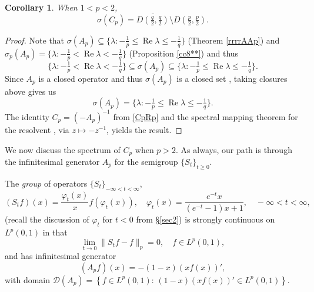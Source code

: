 \documentclass[11pt]{amsart}
\numberwithin{equation}{section}
\theoremstyle{plain}
\newtheorem{Corollary}[equation]{Corollary}
\theoremstyle{definition}
\renewcommand{\leq}{\leqslant}
\renewcommand{\geq}{\geqslant}
\renewcommand{\subset}{\subseteq}
\renewcommand{\phi}{\varphi}
\renewcommand{\Re}[1]{\operatorname{Re} #1 }
\newcommand{\0}{{\color{lightgray}0}}
\begin{document}


\begin{Corollary}\label{spectrums1}
When $1 < p < 2$, 
$$\sigma(C_p) = \overline{D(\tfrac{q}{2}, \tfrac{q}{2})} \setminus D(\tfrac{p}{2}, \tfrac{p}{2}).$$
\end{Corollary}

\begin{proof}
Note that  
$\sigma(A_p)\subseteq\{\lambda:-\tfrac{1}{p}\leq\Re \lambda \leq -\tfrac{1}{q}\}$ (Theorem \ref{rrrrAAp})
and 
$\sigma_{p}(A_p)=\{\lambda:-\tfrac{1}{p}<\Re \lambda <-\tfrac{1}{q}\}$ (Proposition \ref{cc8**})
and thus 
$$\{\lambda: -\tfrac{1}{p}<\Re \lambda <-\tfrac{1}{q}\} \subset \sigma(A_p) \subset \{\lambda:-\tfrac{1}{p} \leq \Re \lambda \leq-\tfrac{1}{q}\}.$$
Since $A_p$ is a closed operator and thus $\sigma(A_p)$ is a closed set  \cite[p.~240]{MR1721989}, taking closures above  gives us
$$\sigma(A_p)=\{\lambda:-\tfrac{1}{p}\leq\Re \lambda \leq -\tfrac{1}{q}\}.$$
The identity $C_p=(-A_p)^{-1}$ from \eqref{CpRp} and the spectral mapping theorem for the resolvent \cite[p.~243]{MR1721989}, via $z \mapsto - z^{-1}$, yields the result. 
\end{proof}


We now discuss the spectrum of $C_p$ when $p > 2$. As always, our path is through the infinitesimal generator $A_p$ for the semigroup  $\{S_t\}_{t \geq 0}$. 

The {\em group} of operators $\{S_t\}_{-\infty < t < \infty}$, 
$$
(S_t f)(x) = \frac{\varphi_t(x)}{x} f(\varphi_t(x)), \quad \varphi_t(x) = \frac{e^{-t}x}{(e^{-t}-1)x+1}, \quad -\infty < t < \infty,
$$
(recall the discussion of $\phi_{t}$ for $t < 0$ from \S \ref{sec2})
is strongly continuous on $L^p(0,1)$ in that 
$$\lim_{t \to 0} \|S_{t} f - f\|_{p} = 0, \quad f \in L^p(0, 1),$$
and has infinitesimal generator 
$$
(A_p f) (x)=-(1-x)(xf(x))', 
$$
with domain 
$
\mathcal{D}(A_p)= \left\{ f \in L^p(0,1): \, (1-x)(xf(x))' \in L^p(0,1) \right\}. 
$
\end{document}
